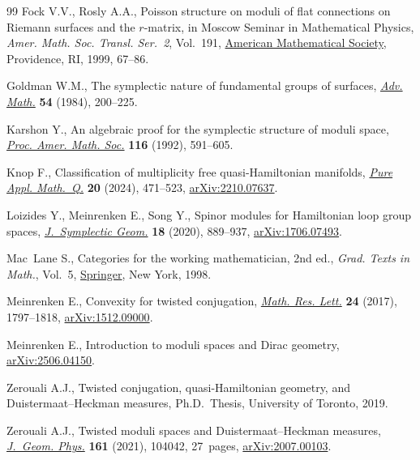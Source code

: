 \documentclass[pdftex]{sigma}
\numberwithin{equation}{section}
\theoremstyle{definition}
\begin{document}
\begin{thebibliography}{99}
Fock V.V., Rosly A.A., Poisson structure on moduli of flat connections on
 {R}iemann surfaces and the {$r$}-matrix, in Moscow {S}eminar in
 {M}athematical {P}hysics, \textit{Amer. Math. Soc. Transl. Ser.~2}, Vol.~191,
 \href{https://doi.org/10.1090/trans2/191/03}{American Mathematical Society},
 Providence, RI, 1999, 67--86.

Goldman W.M., The symplectic nature of fundamental groups of surfaces,
 \href{https://doi.org/10.1016/0001-8708(84)90040-9}{\textit{Adv. Math.}}
 \textbf{54} (1984), 200--225.

Karshon Y., An algebraic proof for the symplectic structure of moduli space,
 \href{https://doi.org/10.2307/2159424}{\textit{Proc. Amer. Math. Soc.}}
 \textbf{116} (1992), 591--605.

Knop F., Classification of multiplicity free quasi-{H}amiltonian manifolds,
 \href{https://doi.org/10.4310/pamq.2024.v20.n1.a10}{\textit{Pure Appl.
 Math.~Q.}} \textbf{20} (2024), 471--523,
 \href{https://arxiv.org/abs/2210.07637}{arXiv:2210.07637}.

Loizides Y., Meinrenken E., Song Y., Spinor modules for {H}amiltonian loop
 group spaces,
 \href{https://doi.org/10.4310/JSG.2020.v18.n3.a10}{\textit{J.~Symplectic
 Geom.}} \textbf{18} (2020), 889--937,
 \href{https://arxiv.org/abs/1706.07493}{arXiv:1706.07493}.

Mac~Lane S., Categories for the working mathematician, 2nd ed., \textit{Grad. Texts in
 Math.}, Vol.~5,
 \href{https://doi.org/10.1007/978-1-4757-4721-8}{Springer}, New York, 1998.


Meinrenken E., Convexity for twisted conjugation,
 \href{https://doi.org/10.4310/MRL.2017.v24.n6.a12}{\textit{Math. Res. Lett.}}
 \textbf{24} (2017), 1797--1818,
 \href{https://arxiv.org/abs/1512.09000}{arXiv:1512.09000}.

Meinrenken E., Introduction to moduli spaces and {D}irac geometry,
 \href{https://arxiv.org/abs/2506.04150}{arXiv:2506.04150}.

Zerouali A.J., Twisted conjugation, quasi-{H}amiltonian geometry, and
 {D}uistermaat--{H}eckman measures, Ph.D.~Thesis, {U}niversity of Toronto,
 2019.

Zerouali A.J., Twisted moduli spaces and {D}uistermaat--{H}eckman measures,
 \href{https://doi.org/10.1016/j.geomphys.2020.104042}{\textit{J.~Geom.
 Phys.}} \textbf{161} (2021), 104042, 27~pages,
 \href{https://arxiv.org/abs/2007.00103}{arXiv:2007.00103}.

\end{thebibliography} \LastPageEnding
\end{document}
